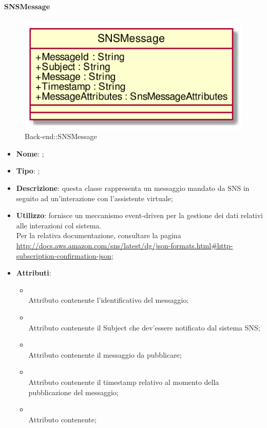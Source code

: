 \hypertarget{SNSMessage_label}{\paragraph{SNSMessage}}
\begin{figure}[h]
	\centering
	\includegraphics[width=\textwidth,height=\textheight,keepaspectratio]{images/ClassSNSMessage.png}
	\caption{Back-end::SNSMessage}
\end{figure}
\begin{itemize}
	\item \textbf{Nome}: ;
	\item \textbf{Tipo}: ;
	\item \textbf{Descrizione}: questa classe rappresenta un messaggio mandato da SNS in seguito ad un'interazione con l'assistente virtuale;
	\item \textbf{Utilizzo}: fornisce un meccanismo event-driven per la gestione dei dati relativi alle interazioni col sistema.\\
Per la relativa documentazione, consultare la pagina \url{http://docs.aws.amazon.com/sns/latest/dg/json-formats.html#http-subscription-confirmation-json};
	\item \textbf{Attributi}:
	\begin{itemize}
		\item[]  \\
		Attributo contenente l'identificativo del messaggio;
		\item[]  \\
		Attributo contenente il Subject che dev'essere notificato dal sistema SNS;
		\item[]  \\
		Attributo contenente il messaggio da pubblicare;
		\item[]  \\
		Attributo contenente il timestamp relativo al momento della pubblicazione del messaggio;
		\item[]  \\
		Attributo contenente;
	\end{itemize}
\end{itemize}

